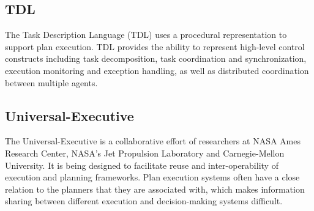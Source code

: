 \documentclass[conference]{IEEEtran}
\begin{document}
\subsection{\textbf{TDL}}\label{sec:tdl}
The Task Description Language (TDL) uses a procedural representation to support plan execution.
TDL provides the ability to represent high-level control constructs including task decomposition, task coordination and synchronization, execution monitoring and exception handling, as well as distributed coordination between multiple agents.

\subsection{\textbf{Universal-Executive}}\label{sec:universal}
The Universal-Executive is a collaborative effort of researchers at NASA Ames Research Center, NASA’s Jet Propulsion Laboratory and Carnegie-Mellon University. It is being designed to facilitate reuse and inter-operability of execution and planning frameworks. Plan execution systems often have a close relation to the planners that they are associated with, which makes information sharing between different execution and decision-making systems difficult.
\end{document}
